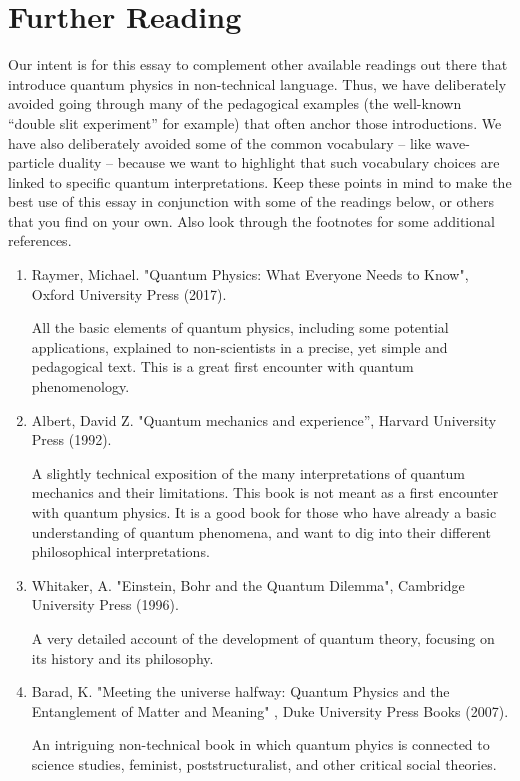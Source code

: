 \documentclass[onecolumn,preprintnumbers,amsmath,amssymbn,reprint,nofootinbib,superscriptaddress]{revtex4}    %
\begin{document}
\section{Further Reading}

Our intent is for this essay to complement other available readings out there that introduce quantum physics in non-technical language.  Thus, we have deliberately avoided going through many of the pedagogical examples (the well-known ``double slit experiment'' for example) that often anchor those introductions.  We have also deliberately avoided some of the common vocabulary -- like wave-particle duality -- because we want to highlight that such vocabulary choices are linked to specific quantum interpretations.  Keep these points in mind to make the best use of this essay in conjunction with some of the readings below, or others that you find on your own.  Also look through the footnotes for some additional references.

%

\begin{enumerate}\item Raymer, Michael. "Quantum Physics: What Everyone Needs to Know", Oxford University Press (2017).\par
All the basic elements of quantum physics, including some potential applications, explained to non-scientists in a precise, yet simple and pedagogical text. This is a great first encounter with quantum phenomenology.

\item Albert, David Z. "Quantum mechanics and experience'', Harvard University Press (1992).
\par A slightly technical exposition of the many interpretations of quantum mechanics and their limitations. This book is not meant as a first encounter with quantum physics. It is a  good book for those who have already a basic understanding of quantum phenomena, and want to dig into their different philosophical interpretations.
\item Whitaker, A. "Einstein, Bohr and the Quantum Dilemma", Cambridge University Press (1996).
\par A very detailed account of the development of quantum theory, focusing on its history and its philosophy.
\item Barad, K. "Meeting the universe halfway: Quantum Physics and the Entanglement of Matter and Meaning" , Duke University Press Books (2007).
\par An intriguing non-technical book in which quantum phyics is connected to science studies, feminist, poststructuralist, and other critical social theories.
\end{enumerate}
\end{document}
